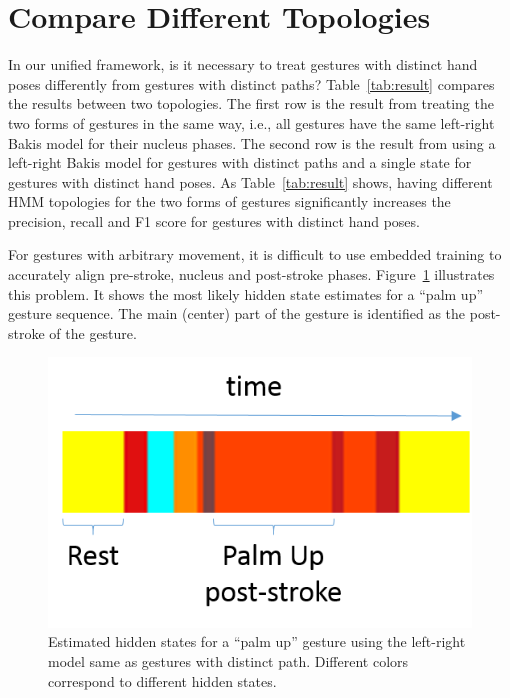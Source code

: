 \section{Compare Different Topologies}
In our unified framework, is it necessary to
treat gestures with distinct hand poses differently from gestures with
distinct paths? Table~\ref{tab:result} compares the results between two topologies. The first
row is the result from treating the two forms of gestures in the same way,
i.e., all gestures have the same left-right Bakis model for their nucleus
phases. The second row is the result from using a left-right Bakis model for
gestures with distinct paths and a single state for gestures with distinct hand
poses.
As Table~\ref{tab:result} shows, having different HMM topologies for the two forms of gestures significantly increases the precision, recall and F1 score for gestures with
distinct hand poses.

For gestures with arbitrary movement, it is difficult to use embedded training
to accurately align pre-stroke, nucleus and post-stroke phases.
Figure~\ref{fig:palm-hidden} illustrates this problem. It shows the most likely
hidden state estimates for a ``palm up'' gesture sequence. The main (center)
part of the gesture is identified as the post-stroke of the gesture.

\begin{figure}
\centering
\includegraphics[width=0.3\linewidth]{figures/palm_hidden_label.png}
\caption{Estimated hidden states for a ``palm up'' gesture using the left-right
model same as gestures with distinct path. Different colors correspond to
different hidden states.}
\label{fig:palm-hidden}
\end{figure}


